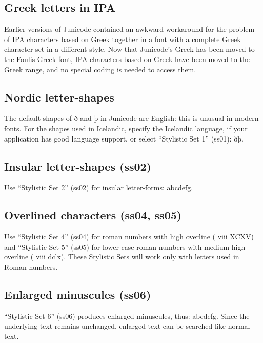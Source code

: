 \documentclass[12pt,a4paper,openany]{book}
\begin{document}
\subsection*{Greek letters in IPA}

Earlier versions of Junicode contained an awkward workaround for the
problem of IPA characters based on Greek together in a font with a
complete Greek character set in a different style. Now that Junicode's
Greek has been moved to the Foulis Greek font, IPA characters based on
Greek have been moved to the Greek range, and no special coding is
needed to access them.

\subsection*{Nordic letter-shapes}

The default shapes of ð and þ in Junicode are English: this is unusual in
modern fonts. For the shapes used in Icelandic, specify the Icelandic
language, if your application has good language support, or select
“Stylistic Set 1” (ss01): { ðþ}.

\subsection*{Insular letter-shapes (ss02)}

Use “Stylistic Set 2” (ss02) for insular letter-forms:
{ abcdefg.}

\subsection*{Overlined characters (ss04, ss05)}

Use “Stylistic Set 4” (ss04) for roman numbers with high overline
({ viii XCXV}) and “Stylistic Set 5”
(ss05) for lower-case roman numbers with medium-high overline
({ viii dclx}). These Stylistic
Sets will work only with letters used in Roman numbers.

\subsection*{Enlarged minuscules (ss06)}

“Stylistic Set 6” (ss06) produces enlarged minuscules, thus:
{ abcdefg.} Since the underlying
text remains unchanged, enlarged text can be searched like normal
text.
\end{document}
